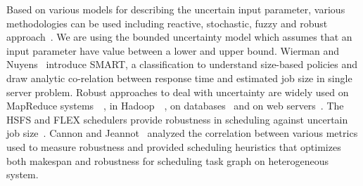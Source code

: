 \documentclass[12pt]{article}
\theoremstyle{mystyle}
\begin{document}
   Based on various models for describing the uncertain input parameter,
   various methodologies can be used including reactive, stochastic,
   fuzzy and robust approach~\cite{DBLP:journals/cce/LiI08}. We are using
   the bounded uncertainty model which assumes that an input parameter
   have value between a lower and upper bound.  Wierman and
   Nuyens~\cite{conf/sigmetrics/WiermanN08} introduce SMART, a
   classification to understand size-based policies and draw analytic
   co-relation between response time and estimated job size in single
   server problem. Robust approaches to deal with uncertainty are widely
   used on MapReduce
   systems~\cite{Kavulya:2010:ATP:1844765.1845224}~\cite{Verma:2011:AAR:1998582.1998637},
   in
   Hadoop~\cite{Wolf:2010:FSA:2023718.2023720}~\cite{White:2009:HDG:1717298},
   on databases~\cite{Lipton199518} and on web
   servers~\cite{Cardellini99dynamicload}. The HSFS and FLEX schedulers
   provide robustness in scheduling against uncertain job
   size~\cite{Wolf:2010:FSA:2023718.2023720,6691554}. Cannon and
   Jeannot~\cite{cj09c} analyzed the correlation between various metrics
   used to measure robustness and provided scheduling heuristics that
   optimizes both makespan and robustness for scheduling task graph on
   heterogeneous system.
   
\end{document}
